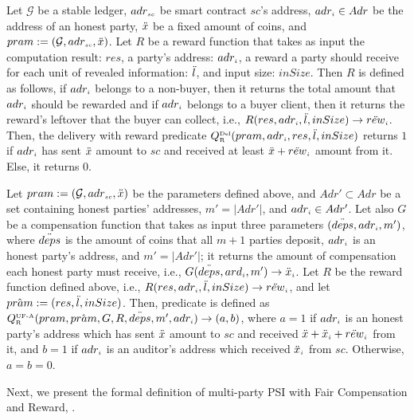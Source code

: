     \begin{definition}   Let $\mathcal{G}$ be a stable ledger, $adr_{\scriptscriptstyle sc}$ be smart contract $sc$'s address, $adr_{\scriptscriptstyle i}\in Adr$ be the address of an honest party, $\ddot{x}$ be a fixed amount of coins, and $pram:=(\mathcal{G}, adr_{\scriptscriptstyle sc}, \ddot{x})$. Let $R$ be a reward function that takes as input the computation result: $res$, a party's address: $adr_{\scriptscriptstyle i}$, a reward a party should receive for each unit of revealed information:  $\ddot{l}$, and input size: $inSize$.  Then $R$ is defined as follows, if $adr_{\scriptscriptstyle i}$ belongs to a non-buyer, then it returns the total amount that $adr_{\scriptscriptstyle i}$ should be rewarded and if $adr_{\scriptscriptstyle i}$ belongs to a buyer client, then it returns the reward's leftover that the buyer can collect, i.e., $R(res, adr_{\scriptscriptstyle i}, \ddot{l}, inSize)\rightarrow \ddot{rew}_{\scriptscriptstyle i}$.    Then, the delivery with reward predicate $Q^{\scriptscriptstyle \text{Del}}_{\scriptscriptstyle\text{R}}(pram,  adr_{\scriptscriptstyle i}, res, \ddot{l}, inSize)$ returns $1$ if $adr_{\scriptscriptstyle i}$ has sent $\ddot{x}$ amount to $sc$ and received at least $\ddot{x}+\ddot{rew}_{\scriptscriptstyle i}$ amount from it. Else, it returns $0$. 
%
  \end{definition}


\vs


   \begin{definition}  
 Let $pram:=(\mathcal{G}, adr_{\scriptscriptstyle sc}, \ddot{x})$ be the parameters defined above, and $Adr'\subset Adr$ be a set containing honest parties' addresses, $m' = |Adr'|$,  and   $adr_{\scriptscriptstyle i}\in Adr'$. Let also $G$ be a compensation function that takes as input  three parameters $(\ddot{deps}, adr_{\scriptscriptstyle i}, m')$, where $\ddot{deps}$ is the amount of coins that all $m+1$ parties deposit, $adr_{\scriptscriptstyle i}$ is an honest party's address, and $m' = |Adr'|$; it returns the amount of compensation each honest party must receive, i.e., $G(\ddot{deps}, ard_{\scriptscriptstyle i}, m')\rightarrow \ddot{x}_{\scriptscriptstyle i}$. Let $R$ be the reward function defined above, i.e., $R(res, adr_{\scriptscriptstyle i}, \ddot{l}, inSize)\rightarrow \ddot{rew}_{\scriptscriptstyle i}$, and let $\hat {pram}:=(res, \ddot{l}, inSize)$.  Then, predicate \qUnFAbtwr is defined as $Q^{\scriptscriptstyle \text{UF-A}}_{\scriptscriptstyle \text{R}}(pram, \hat {pram}, G, R, \ddot{deps}, m', adr_{\scriptscriptstyle i})\rightarrow (a,b)$, where $a=1$ if $adr_{\scriptscriptstyle i}$ is an honest party's address which has sent $\ddot{x}$ amount to $sc$ and received  $\ddot{x}+\ddot{x}_{\scriptscriptstyle i}+\ddot{rew}_{\scriptscriptstyle i}$  from it, and $b=1$ if $adr_{\scriptscriptstyle i}$ is an auditor's address which received $\ddot{x}_{\scriptscriptstyle i}$  from $sc$. Otherwise, $a=b=0$. 
  \end{definition}

 \svs
 
Next, we present the formal definition of multi-party PSI with Fair Compensation and Reward, \ep. 


